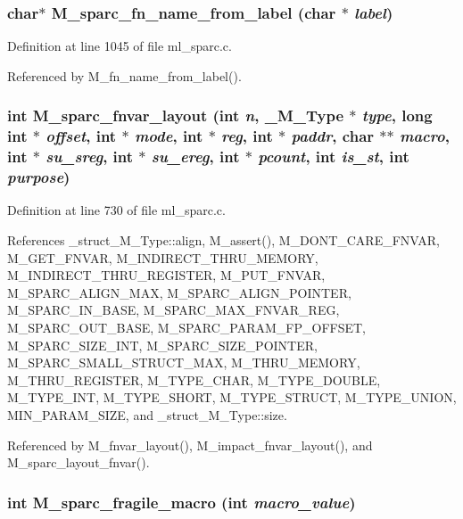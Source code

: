\subsubsection{\setlength{\rightskip}{0pt plus 5cm}char$\ast$ M\_\-sparc\_\-fn\_\-name\_\-from\_\-label (char $\ast$ {\em label})}\label{m__sparc_8h_2bdb33821bd5adb9064cac42d5dbb44a}




Definition at line 1045 of file ml\_\-sparc.c.

Referenced by M\_\-fn\_\-name\_\-from\_\-label().
\subsubsection{\setlength{\rightskip}{0pt plus 5cm}int M\_\-sparc\_\-fnvar\_\-layout (int {\em n}, \bf{\_\-M\_\-Type} $\ast$ {\em type}, long int $\ast$ {\em offset}, int $\ast$ {\em mode}, int $\ast$ {\em reg}, int $\ast$ {\em paddr}, char $\ast$$\ast$ {\em macro}, int $\ast$ {\em su\_\-sreg}, int $\ast$ {\em su\_\-ereg}, int $\ast$ {\em pcount}, int {\em is\_\-st}, int {\em purpose})}\label{m__sparc_8h_c4c1c1d7d55a98254d1b4a73f7548238}




Definition at line 730 of file ml\_\-sparc.c.

References \_\-struct\_\-M\_\-Type::align, M\_\-assert(), M\_\-DONT\_\-CARE\_\-FNVAR, M\_\-GET\_\-FNVAR, M\_\-INDIRECT\_\-THRU\_\-MEMORY, M\_\-INDIRECT\_\-THRU\_\-REGISTER, M\_\-PUT\_\-FNVAR, M\_\-SPARC\_\-ALIGN\_\-MAX, M\_\-SPARC\_\-ALIGN\_\-POINTER, M\_\-SPARC\_\-IN\_\-BASE, M\_\-SPARC\_\-MAX\_\-FNVAR\_\-REG, M\_\-SPARC\_\-OUT\_\-BASE, M\_\-SPARC\_\-PARAM\_\-FP\_\-OFFSET, M\_\-SPARC\_\-SIZE\_\-INT, M\_\-SPARC\_\-SIZE\_\-POINTER, M\_\-SPARC\_\-SMALL\_\-STRUCT\_\-MAX, M\_\-THRU\_\-MEMORY, M\_\-THRU\_\-REGISTER, M\_\-TYPE\_\-CHAR, M\_\-TYPE\_\-DOUBLE, M\_\-TYPE\_\-INT, M\_\-TYPE\_\-SHORT, M\_\-TYPE\_\-STRUCT, M\_\-TYPE\_\-UNION, MIN\_\-PARAM\_\-SIZE, and \_\-struct\_\-M\_\-Type::size.

Referenced by M\_\-fnvar\_\-layout(), M\_\-impact\_\-fnvar\_\-layout(), and M\_\-sparc\_\-layout\_\-fnvar().
\subsubsection{\setlength{\rightskip}{0pt plus 5cm}int M\_\-sparc\_\-fragile\_\-macro (int {\em macro\_\-value})}\label{m__sparc_8h_76db0d78c52a3d7d97e43d368b8f839c}




